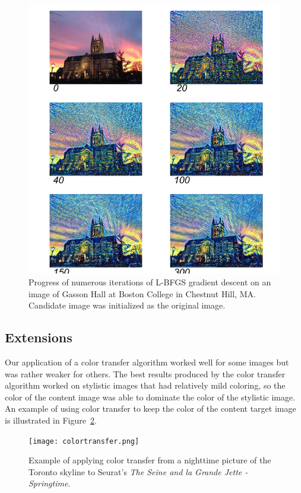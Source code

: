\documentclass[11pt,letterpaper,journal]{IEEEtran}
\begin{document}
\begin{figure}[t]
  \centering
  \includegraphics[width=\linewidth]{iter.png}
  \caption{Progress of numerous iterations of L-BFGS gradient descent on an
  image of Gasson Hall at Boston College in Chestnut Hill, MA. Candidate image
was initialized as the original image.}
  \label{fig:iter}
\end{figure}

\subsection{Extensions}

Our application of a color transfer algorithm worked well for some images but
was rather weaker for others. The best results produced by the color transfer
algorithm worked on stylistic images that had relatively mild coloring, so the
color of the content image was able to dominate the color of the stylistic
image. An example of using color transfer to keep the color of the content
target image is illustrated in Figure~\ref{fig:ct}.

\begin{figure}[h]
  \centering
  \texttt{[image: colortransfer.png]}
  \caption{Example of applying color transfer from a nighttime picture of the
    Toronto skyline to Seurat's \emph{The Seine and la Grande Jette -
    Springtime}. }
  \label{fig:ct}
\end{figure}
\end{document}
